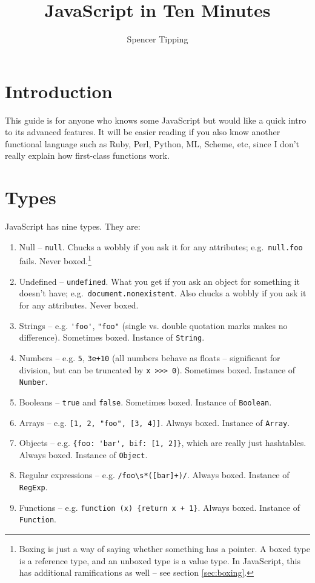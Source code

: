 \documentclass{article}
\title{JavaScript in Ten Minutes}
\author{Spencer Tipping}
\begin{document}
\maketitle\tableofcontents

\newpage
\section {Introduction}
  This guide is for anyone who knows some JavaScript but would like a quick intro to its advanced features. It will be easier reading if you also know another functional language such as Ruby,
  Perl, Python, ML, Scheme, etc, since I don't really explain how first-class functions work.

\section {Types}
  JavaScript has nine types. They are:

\begin{enumerate}
\item Null -- \verb|null|. Chucks a wobbly if you ask it for any attributes; e.g.~\verb|null.foo| fails. Never boxed.\footnote{Boxing is just a way of saying whether something has a pointer. A
      boxed type is a reference type, and an unboxed type is a value type. In JavaScript, this has additional ramifications as well -- see section \ref{sec:boxing}.}
\item Undefined -- \verb|undefined|. What you get if you ask an object for something it doesn't have; e.g.~\verb|document.nonexistent|. Also chucks a wobbly if you ask it for any attributes.
      Never boxed.
\item Strings -- e.g. \verb|'foo'|, \verb|"foo"| (single vs. double quotation marks makes no difference). Sometimes boxed. Instance of \verb|String|.
\item Numbers -- e.g. \verb|5|, \verb|3e+10| (all numbers behave as floats -- significant for division, but can be truncated by \verb|x >>> 0|). Sometimes boxed. Instance of \verb|Number|.
\item Booleans -- \verb|true| and \verb|false|. Sometimes boxed. Instance of \verb|Boolean|.
\item Arrays -- e.g. \verb|[1, 2, "foo", [3, 4]]|. Always boxed. Instance of \verb|Array|.
\item Objects -- e.g. \verb|{foo: 'bar', bif: [1, 2]}|, which are really just hashtables. Always boxed. Instance of \verb|Object|.
\item Regular expressions -- e.g. \verb|/foo\s*([bar]+)/|. Always boxed. Instance of \verb|RegExp|.
\item Functions -- e.g. \verb|function (x) {return x + 1}|. Always boxed. Instance of \verb|Function|.
\end{enumerate}
\end{document}
